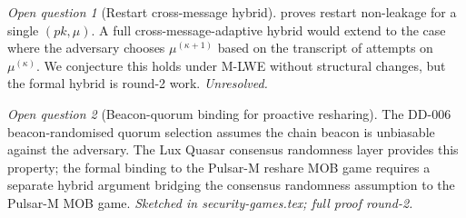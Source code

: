 \documentclass[11pt,a4paper]{article}
\theoremstyle{definition}
\theoremstyle{remark}
\newtheorem{openq}{Open question}
\begin{document}
\begin{openq}[Restart cross-message hybrid]
 proves restart non-leakage for a single
$(\mathit{pk}, \mu)$. A full cross-message-adaptive hybrid would
extend to the case where the adversary chooses $\mu^{(\kappa+1)}$
based on the transcript of attempts on $\mu^{(\kappa)}$. We
conjecture this holds under M-LWE without structural changes, but
the formal hybrid is round-2 work. \emph{Unresolved.}
\end{openq}

\begin{openq}[Beacon-quorum binding for proactive resharing]
The DD-006 beacon-randomised quorum selection assumes the chain
beacon is unbiasable against the adversary. The Lux Quasar
consensus randomness layer provides this property; the formal
binding to the Pulsar-M reshare MOB game requires a separate
hybrid argument bridging the consensus randomness assumption to
the Pulsar-M MOB game. \emph{Sketched in security-games.tex; full
proof round-2.}
\end{openq}



\end{document}
